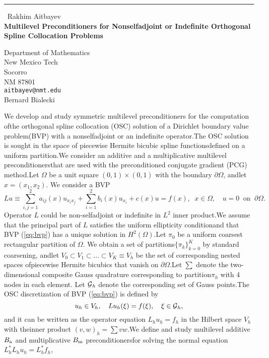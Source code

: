 \documentclass{report}
\begin{document}
\begin{center}
\rule{6in}{1pt} \
{\large Rakhim Aitbayev \\
{\bf Multilevel Preconditioners for Nonselfadjoint or Indefinite Orthogonal Spline Collocation Problems}}

Department of Mathematics \\ New Mexico Tech \\ Socorro \\ NM 87801
\\
{\tt aitbayev@nmt.edu}\\
Bernard Bialecki\end{center}

\newtheorem*{theorem}{Theorem}\newcommand{\GP}{\mbox{${\cal G}$}}\newcommand{\SH}{\mbox{$\scriptscriptstyle H^{2}(\Omega)$}}\newcommand{\SL}{\mbox{$\scriptscriptstyle L^{2}(\Omega)$}}We develop and study symmetric multilevel preconditioners for the computation ofthe orthogonal spline collocation (OSC) solution of a Dirichlet boundary value problem(BVP) with a nonselfadjoint or an indefinite operator.The OSC solution is sought in the space of piecewise Hermite bicubic spline functionsdefined on a uniform partition.We consider an additive and a multiplicative multilevel preconditionersthat are used with the preconditioned conjugate gradient (PCG) method.Let $\Omega$ be a unit square $(0,1)\times(0,1)$ with the boundary $\partial\Omega$,
andlet $x=(x_1,x_2)$.
We consider a BVP\begin{equation}\label{eq:bvp}Lu\equiv\sum_{i,j=1}^{2} a_{ij}(x)u_{x_ix_j}+\sum_{i=1}^{2} b_i(x) u_{x_i}+c(x)u = f(x),\;\;x\in\Omega,\quad u=0 \;\;\mbox{on}\;\;\partial\Omega.\end{equation}Operator $L$ could be non-selfadjoint or indefinite in $L^2$ inner product.We assume that the principal part of $L$ satisfies the uniform ellipticity conditionand that BVP (\ref{eq:bvp}) has a unique solution in $H^2(\Omega)$.Let $\pi_0$ be a uniform coarsest rectangular partition of $\Omega$.
We obtain a set of partitions$\{\pi_k\}_{k=0}^{K}$ by standard coarsening,
andlet $V_0\subset V_1\subset\ldots\subset V_K\equiv V_h$ be the set of corresponding nested spaces ofpiecewise Hermite bicubics that vanish on $\partial\Omega$.Let $\sum$ denote the two-dimensional composite Gauss quadrature corresponding to partition$\pi_h$ with 4 nodes in each element.
Let $\GP_h$ denote the corresponding set of Gauss points.The OSC discretization of BVP (\ref{eq:bvp}) is defined by\begin{equation}\label{eq:osc}u_h\in V_h,\quad Lu_h(\xi)=f(\xi),\quad\xi\in\GP_h,\end{equation}and it can be written as the operator equation $L_hu_h=f_h$ in the Hilbert space $V_h$ with theinner product $(v,w)_h=\sum vw$.We define and study multilevel additive$B_{\textup{\scriptsize a}}$ and multiplicative $B_{\textup{\scriptsize m}}$ preconditionersfor solving the normal equation $L_h^*L_hu_h=L_h^*f_h$,
\end{document}
